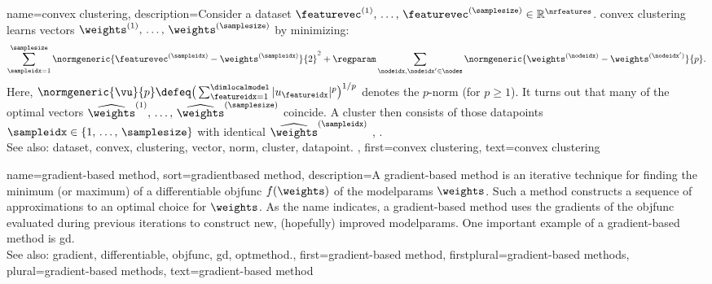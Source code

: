 {name={convex clustering}, 
 	description={Consider a \gls{dataset} 
 		$\featurevec^{(1)}, \,\ldots, \,\featurevec^{(\samplesize)} \in \mathbb{R}^{\nrfeatures}$. 
 		\Gls{convex} \gls{clustering} learns \glspl{vector} $\weights^{(1)}, \,\ldots, \,\weights^{(\samplesize)}$ by minimizing:
 		$$\sum_{\sampleidx=1}^{\samplesize} \normgeneric{\featurevec^{(\sampleidx)} - \weights^{(\sampleidx)}}{2}^2 + 
 		\regparam \sum_{\nodeidx,\nodeidx' \in \nodes} \normgeneric{\weights^{(\nodeidx)} - \weights^{(\nodeidx')}}{p}.$$ 
		Here, $\normgeneric{\vu}{p} \defeq \big( \sum_{\featureidx=1}^{\dimlocalmodel} |u_{\featureidx}|^{p} \big)^{1/p}$ 
		denotes the $p$-\gls{norm} (for $p\geq1$).  
		It turns out that many of the optimal \glspl{vector} $\widehat{\weights}^{(1)}, \,\ldots, \,\widehat{\weights}^{(\samplesize)}$ 
		coincide. A \gls{cluster} then consists of those \glspl{datapoint} $\sampleidx \in \{1, \,\ldots, \,\samplesize\}$ 
		with identical $\widehat{\weights}^{(\sampleidx)}$ \cite{JMLR:v22:18-694}, \cite{Pelckmans2005}. 
			\\
		See also: \gls{dataset}, \gls{convex}, \gls{clustering}, \gls{vector}, \gls{norm}, \gls{cluster}, \gls{datapoint}. },
 	first={convex clustering},
	text={convex clustering} 
}

{name={gradient-based method}, 
sort={gradientbased method}, 
	description={A \gls{gradient}-based 
		method is an iterative technique for finding the \gls{minimum} (or \gls{maximum}) 
		of a \gls{differentiable} \gls{objfunc} $f(\weights)$ of the \glspl{modelparam} $\weights$. 
		Such a method constructs a \gls{sequence} of approximations to an optimal choice for $\weights$. 
		As the name indicates, a \gls{gradient}-based method uses the \glspl{gradient} 
		of the \gls{objfunc} evaluated during previous \glspl{iteration} to construct new, 
		(hopefully) improved \glspl{modelparam}. One important example of a \gls{gradient}-based 
		method is \gls{gd}.
				\\
		See also: \gls{gradient}, \gls{differentiable}, \gls{objfunc}, \gls{gd}, \gls{optmethod}.},
	first={gradient-based method},
	firstplural={gradient-based methods},
	plural={gradient-based methods},
	text={gradient-based method} 
}

